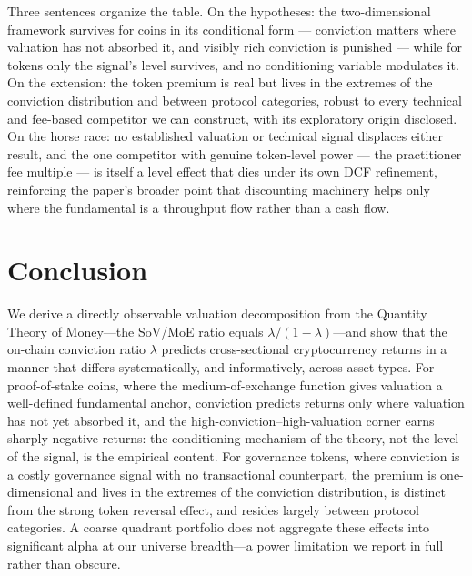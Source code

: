 \documentclass[12pt]{article}
\begin{document}
Three sentences organize the table. On the hypotheses: the two-dimensional framework
survives for coins in its conditional form --- conviction matters where valuation has
not absorbed it, and visibly rich conviction is punished --- while for tokens only the
signal's level survives, and no conditioning variable modulates it. On the extension:
the token premium is real but lives in the extremes of the conviction distribution and
between protocol categories, robust to every technical and fee-based competitor we can
construct, with its exploratory origin disclosed. On the horse race: no established
valuation or technical signal displaces either result, and the one competitor with
genuine token-level power --- the practitioner fee multiple --- is itself a level
effect that dies under its own DCF refinement, reinforcing the paper's broader point
that discounting machinery helps only where the fundamental is a throughput flow
rather than a cash flow.

\FloatBarrier
\section{Conclusion}
\label{sec:conclusion}

We derive a directly observable valuation decomposition from the Quantity Theory of
Money---the SoV/MoE ratio equals $\lambda/(1-\lambda)$---and show that the on-chain
conviction ratio $\lambda$ predicts cross-sectional cryptocurrency returns in a manner
that differs systematically, and informatively, across asset types. For proof-of-stake
coins, where the medium-of-exchange function gives valuation a well-defined fundamental
anchor, conviction predicts returns only where valuation has not yet absorbed it, and
the high-conviction--high-valuation corner earns sharply negative returns: the
conditioning mechanism of the theory, not the level of the signal, is the empirical
content. For governance tokens, where conviction is a costly governance signal with no
transactional counterpart, the premium is one-dimensional and lives in the extremes of
the conviction distribution, is distinct from the strong token reversal effect, and
resides largely between protocol categories. A coarse quadrant portfolio does not
aggregate these effects into significant alpha at our universe breadth---a power
limitation we report in full rather than obscure.
\end{document}
